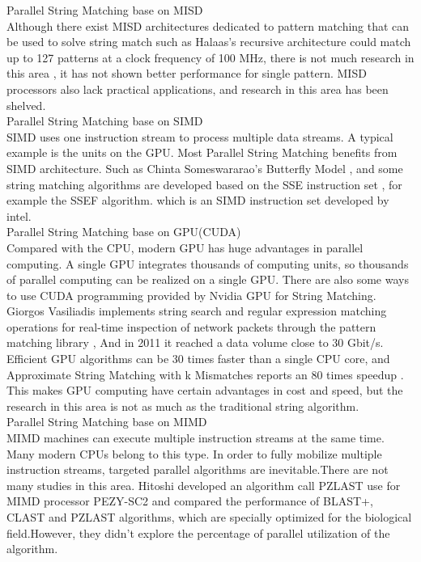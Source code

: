 \documentclass[11pt]{article}       %
\begin{document}
Parallel String Matching base on MISD\\
Although there exist MISD architectures dedicated to pattern matching that can be used to solve string match such as Halaas's recursive architecture \cite{MISD} could match up to 127 patterns at a clock frequency of 100 MHz, there is not much research in this area , it has not shown better performance for single pattern. MISD processors also lack practical applications, and research in this area has been shelved. \\


Parallel String Matching base on SIMD\\
SIMD uses one instruction stream to process multiple data streams. A typical example is the units on the GPU. Most Parallel String Matching benefits from SIMD architecture. Such as Chinta Someswararao's Butterfly Model \cite{Butterfly}, and some string matching algorithms are developed based on the SSE instruction set \cite{Matching}, for example the SSEF algorithm. which is an SIMD instruction set developed by intel. \\

Parallel String Matching base on GPU(CUDA)\\
Compared with the CPU, modern GPU has huge advantages in parallel computing. A single GPU integrates thousands of computing units, so thousands of parallel computing can be realized on a single GPU. There are also some ways to use CUDA programming provided by Nvidia GPU for String Matching. Giorgos Vasiliadis implements string search and regular expression matching operations for real-time inspection of network packets through the pattern matching library \cite{Bit-Parallel}, And in 2011 it reached a data volume close to 30 Gbit/s. Efficient GPU algorithms can be 30 times faster than a single CPU core, and Approximate String Matching with k Mismatches reports an 80 times speedup \cite{pattern-matching}. This makes GPU computing have certain advantages in cost and speed, but the research in this area is not as much as the traditional string algorithm. \\


Parallel String Matching base on MIMD\\
MIMD machines can execute multiple instruction streams at the same time. Many modern CPUs belong to this type. In order to fully mobilize multiple instruction streams, targeted parallel algorithms are inevitable.There are not many studies in this area. Hitoshi developed an algorithm call PZLAST use for MIMD processor PEZY-SC2 and compared the performance of BLAST+, CLAST and PZLAST algorithms\cite{MIMD}, which are specially optimized for the biological field.However, they didn't explore the percentage of parallel utilization of the algorithm.\\
\end{document}
